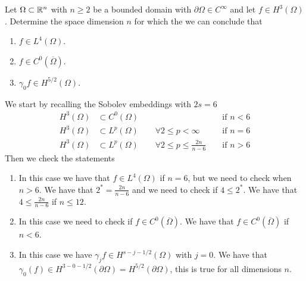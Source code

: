 \newpage
\begin{exercise}
    Let \(\Omega \subset \mathbb{R}^n\) with \(n \geq 2\) be a bounded domain with \(\partial \Omega \in C^\infty\) and let \(f \in H^3(\Omega)\). Determine the space dimension \(n\) for which the we can conclude that
    \begin{enumerate}
        \item \(f \in L^4(\Omega)\).
        \item \(f \in C^0(\overline{\Omega})\).
        \item \(\gamma_0 f \in H^{5/2}(\Omega)\).
    \end{enumerate}
\end{exercise}
We start by recalling the Sobolev embeddings with \(2s = 6\)
\begin{align*}
    H^3(\Omega) & \subset C^0(\Omega)                                               &  & \text{ if } n < 6 \\
    H^3(\Omega) & \subset L^p(\Omega) \qquad \forall 2 \leq p < \infty              &  & \text{ if } n = 6 \\
    H^3(\Omega) & \subset L^p(\Omega) \qquad \forall 2 \leq p \leq \frac{2n}{n - 6} &  & \text{ if } n > 6
\end{align*}
Then we check the statements
\begin{enumerate}
    \item In this case we have that \(f \in L^4(\Omega)\) if \(n = 6\), but we need to
          check when \(n > 6\). We have that \(2^* = \frac{2n}{n - 6}\) and we need to
          check if \(4 \leq 2^*\). We have that \(4 \leq \frac{2n}{n - 6}\) if \(n \leq
          12\).
    \item In this case we need to check if \(f \in C^0(\overline{\Omega})\). We have that
          \(f \in C^0(\overline{\Omega})\) if \(n < 6\).
    \item In this case we have \(\gamma_j f \in H^{s-j-1/2}(\Omega)\) with \(j = 0\). We
          have that \(\gamma_0(f) \in H^{3 - 0 - 1/2}(\partial\Omega) =
          H^{5/2}(\partial\Omega)\), this is true for all dimensions \(n\).
\end{enumerate}

\newpage


